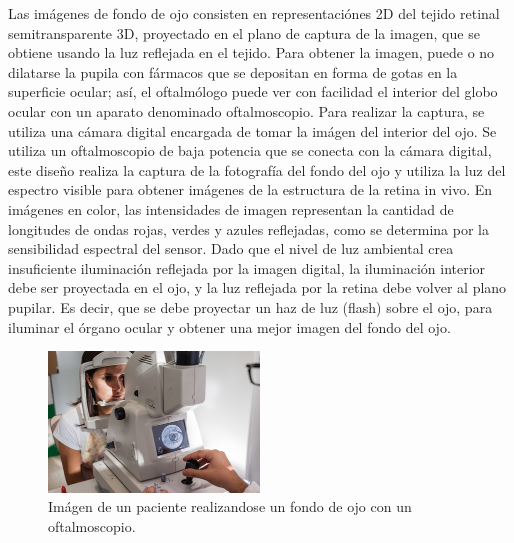 Las im\'agenes de fondo de ojo consisten en representaci\'ones 2D del tejido retinal semitransparente 3D, proyectado en el plano de captura de la imagen, que se obtiene usando la luz reflejada en el tejido.
Para obtener la imagen, puede o no dilatarse la pupila con f\'armacos que se depositan en forma de gotas en la superficie ocular; as\'i, el oftalm\'ologo puede ver con facilidad el interior del globo ocular con un aparato denominado oftalmoscopio. 
Para realizar la captura, se utiliza una c\'amara digital encargada de tomar la im\'agen del interior del ojo. Se utiliza un oftalmoscopio de baja potencia que se conecta con la c\'amara digital, este diseño realiza la captura de la fotograf\'ia del fondo del ojo y utiliza la luz del espectro visible para obtener im\'agenes de la estructura de la retina in vivo. En im\'agenes en color, las intensidades de imagen representan la cantidad de longitudes de ondas rojas, verdes y azules reflejadas, como se determina por la sensibilidad espectral del sensor. Dado que el nivel de luz ambiental crea insuficiente iluminaci\'on reflejada por la imagen digital, la iluminaci\'on interior debe ser proyectada en el ojo, y la luz reflejada por la retina debe volver al plano pupilar. Es decir, que se debe proyectar un haz de luz (flash) sobre el ojo, para iluminar el \'organo ocular y obtener una mejor imagen del fondo del ojo. \cite{kanagasingam2014progress}
\begin{figure}[H]
	{
	\centering
	\includegraphics[width=0.5\textwidth]{Figures/retinografo-fondo-de-ojo}
	\caption[Fotografia de fondo de ojo]{Im\'agen de un paciente realizandose un fondo de ojo con un oftalmoscopio.}
	\label{fig:OftalmoscopioFondoOjo}
	}
\end{figure}
